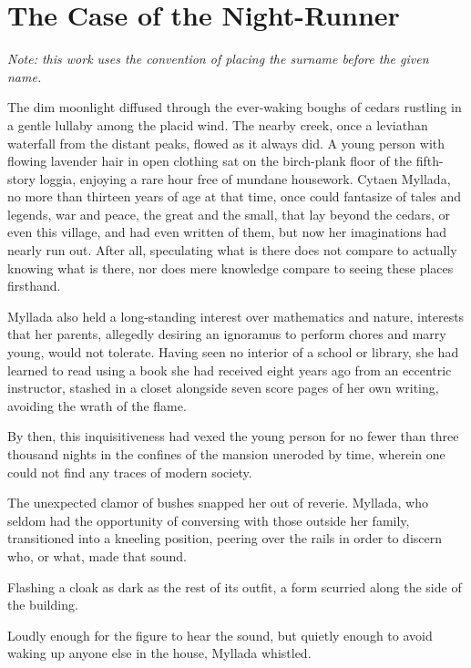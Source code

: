 

\chapter{The Case of the Night-Runner}

\emph{Note: this work uses the convention of placing the surname before the given name.}

The dim moonlight diffused through the ever-waking boughs of cedars rustling in a gentle lullaby among the placid wind.  The nearby creek, once a leviathan waterfall from the distant peaks, flowed as it always did. A young person with flowing lavender hair in open clothing sat on the birch-plank floor of the fifth-story loggia, enjoying a rare hour free of mundane housework. Cytaen Myllada, no more than thirteen years of age at that time, once could fantasize of tales and legends, war and peace, the great and the small, that lay beyond the cedars, or even this village, and had even written of them, but now her imaginations had nearly run out. After all, speculating what is there does not compare to actually knowing what is there, nor does mere knowledge compare to seeing these places firsthand.

Myllada also held a long-standing interest over mathematics and nature, interests that her parents, allegedly desiring an ignoramus to perform chores and marry young, would not tolerate. Having seen no interior of a school or library, she had learned to read using a book she had received eight years ago from an eccentric instructor, stashed in a closet alongside seven score pages of her own writing, avoiding the wrath of the flame.

By then, this inquisitiveness had vexed the young person for no fewer than three thousand nights in the confines of the mansion uneroded by time, wherein one could not find any traces of modern society.

The unexpected clamor of bushes snapped her out of reverie. Myllada, who seldom had the opportunity of conversing with those outside her family, transitioned into a kneeling position, peering over the rails in order to discern who, or what, made that sound.

Flashing a cloak as dark as the rest of its outfit, a form scurried along the side of the building.

Loudly enough for the figure to hear the sound, but quietly enough to avoid waking up anyone else in the house, Myllada whistled.

